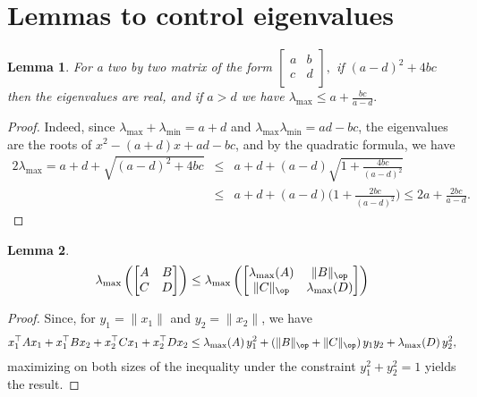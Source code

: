 \documentclass{article}
\newtheorem{lemma}{Lemma}
\begin{document}
\section{Lemmas to control eigenvalues}
\begin{lemma}
For a two by two matrix of the form
$\begin{bmatrix}
a & b\\
c & d \\
\end{bmatrix},
$
if $(a-d)^2+4bc$ then the eigenvalues are real, and if $a>d$ we have  $\displaystyle \lambda_{\max}\leq a+\frac{bc}{a-d}.$
\end{lemma}
\begin{proof}
 Indeed, since $\lambda_{\max}+\lambda_{\min}=a+d$ and $\lambda_{\max}\lambda_{\min}=ad-bc$, the eigenvalues are the roots of $x^2-(a+d)x+ad-bc$, and by the quadratic formula, we have
\begin{eqnarray*}
2 \lambda_{\max} = a+d+\sqrt{(a-d)^2+4bc}  & \leq & a+d+(a-d) \sqrt{1+\frac{4bc}{(a-d)^2}}\\
& \leq & a+d+(a-d) \Big (1+\frac{2bc}{(a-d)^2} \Big )
\leq 2a +\frac{2bc}{a-d}.
\end{eqnarray*}
\end{proof}

\begin{lemma}
\label{lem:lmax_twobywto}
$$
\lambda_{\max} \left (
\begin{bmatrix}
A & B \\
C & D
\end{bmatrix}
\right)
 \leq 
\lambda_{\max} \left (
\begin{bmatrix}
\lambda_{\max}(A) & \|B\|_{\op} \\
\|C\|_{\op} & \lambda_{\max}(D)
\end{bmatrix}
\right ) 
$$
\end{lemma}
\begin{proof}
Since, for $y_1=\|x_1\|$ and $y_2=\|x_2\|$, we have
$$x_1^\top A x_1 + x_1^\top B x_2 + x_2^\top C x_1 + x_2^\top D x_2 \leq  \lambda_{\max}(A) \, y_1^2 +  (\|B\|_{\op}+  \|C\|_{\op}) \, y_1 y_2+ \lambda_{\max}(D) \, y_2^2,$$
 maximizing on both sizes of the inequality under the constraint $y_1^2+y_2^2=1$ yields the result. 
\end{proof}


\end{document}
